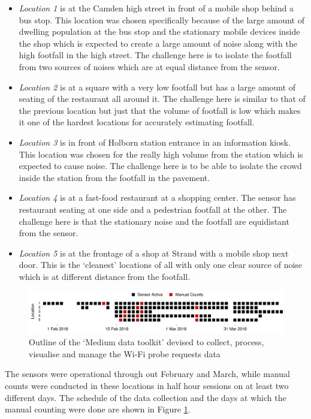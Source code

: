 \begin{itemize}
  \item \textit{Location 1} is at the Camden high street in front of a mobile shop behind a bus stop. This location was chosen specifically because of the large amount of dwelling population at the bus stop and the stationary mobile devices inside the shop which is expected to create a large amount of noise along with the high footfall in the high street. The challenge here is to isolate the footfall from two sources of noises which are at equal distance from the sensor.
  \item \textit{Location 2} is at a square with a very low footfall but has a large amount of seating of the restaurant all around it. The challenge here is similar to that of the previous location but just that the volume of footfall is low which makes it one of the hardest locations for accurately estimating footfall.
  \item \textit{Location 3} is in front of Holborn station entrance in an information kiosk. This location was chosen for the really high volume from the station which is expected to cause noise. The challenge here is to be able to isolate the crowd inside the station from the footfall in the pavement.
  \item \textit{Location 4} is at a fast-food restaurant at a shopping center. The sensor has restaurant seating at one side and a pedestrian footfall at the other. The challenge here is that the stationary noise and the footfall are equidistant from the sensor.
  \item \textit{Location 5} is at the frontage of a shop at Strand with a mobile shop next door. This is the `cleanest' locations of all with only one clear source of noise which is at different distance from the footfall.
\end{itemize}

\begin{figure}
  \includegraphics{images/pilot-study-schedule.png}
  \caption{Outline of the `Medium data toolkit' devised to collect, process, visualise and manage the Wi-Fi probe requests data}
  \label{figure:collection:pilot:schedule}
\end{figure}

The sensors were operational through out February and March, while manual counts were conducted in these locations in half hour sessions on at least two different days.
The schedule of the data collection and the days at which the manual counting were done are shown in Figure \ref{figure:collection:pilot:schedule}.

